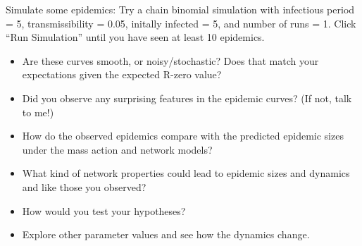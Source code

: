 \documentclass{article}
\begin{document}
Simulate some epidemics: Try a chain binomial simulation with infectious period = 5, transmissibility = 0.05, initally infected = 5, and number of runs = 1.  Click ``Run Simulation'' until you have seen at least 10 epidemics.
\begin{itemize}
 \item Are these curves smooth, or noisy/stochastic?  Does that match your expectations given the expected R-zero value?
 \item Did you observe any surprising features in the epidemic curves? (If not, talk to me!) 
 \item How do the observed epidemics compare with the predicted epidemic sizes under the mass action and network models?
 \item What kind of network properties could lead to epidemic sizes and dynamics and like those you observed?
 \item How would you test your hypotheses?
 \item Explore other parameter values and see how the dynamics change.
\end{itemize}
\end{document}
